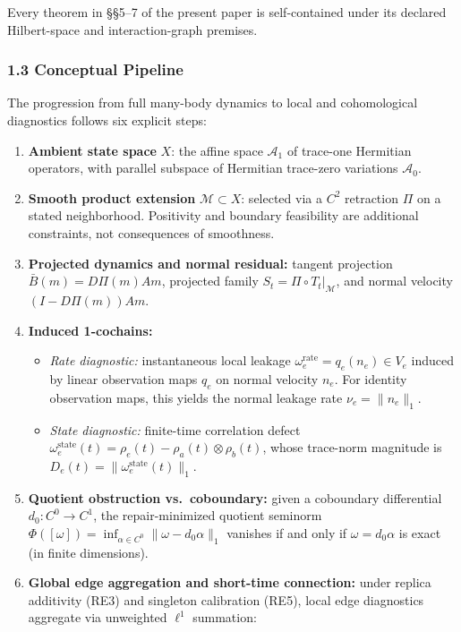 \documentclass[
  11pt,
]{article}
\providecommand{\tightlist}{%
  \setlength{\itemsep}{0pt}\setlength{\parskip}{0pt}}
\providecommand{\tightlist}{%
  \setlength{\itemsep}{0pt}\setlength{\parskip}{0pt}}
\begin{document}
Every theorem in §§5--7 of the present paper is self-contained under its declared Hilbert-space and interaction-graph premises.

\subsubsection{1.3 Conceptual Pipeline}\label{conceptual-pipeline}

The progression from full many-body dynamics to local and cohomological diagnostics follows six explicit steps:

\begin{enumerate}
\def\labelenumi{\arabic{enumi}.}
\tightlist
\item
  \textbf{Ambient state space} \(X\): the affine space \(\mathcal{A}_1\) of trace-one Hermitian operators, with parallel subspace of Hermitian trace-zero variations \(\mathcal{A}_0\).
\item
  \textbf{Smooth product extension} \(\mathcal{M}\subset X\): selected via a \(C^2\) retraction \(\Pi\) on a stated neighborhood. Positivity and boundary feasibility are additional constraints, not consequences of smoothness.
\item
  \textbf{Projected dynamics and normal residual:} tangent projection \(\bar B(m)=D\Pi(m)Am\), projected family \(S_t=\Pi\circ T_t|_{\mathcal{M}}\), and normal velocity \((I-D\Pi(m))Am\).
\item
  \textbf{Induced 1-cochains:}

  \begin{itemize}
  \tightlist
  \item
    \emph{Rate diagnostic:} instantaneous local leakage \(\omega_e^{\mathrm{rate}} = q_e(n_e) \in V_e\) induced by linear observation maps \(q_e\) on normal velocity \(n_e\). For identity observation maps, this yields the normal leakage rate \(\nu_e = \lVert n_e\rVert_1\).
  \item
    \emph{State diagnostic:} finite-time correlation defect \(\omega_e^{\mathrm{state}}(t) = \rho_e(t) - \rho_a(t)\otimes\rho_b(t)\), whose trace-norm magnitude is \(D_e(t) = \lVert\omega_e^{\mathrm{state}}(t)\rVert_1\).
  \end{itemize}
\item
  \textbf{Quotient obstruction vs.~coboundary:} given a coboundary differential \(d_0:C^0\to C^1\), the repair-minimized quotient seminorm \(\Phi([\omega])=\inf_{\alpha\in C^0}\lVert\omega-d_0\alpha\rVert_1\) vanishes if and only if \(\omega=d_0\alpha\) is exact (in finite dimensions).
\item
  \textbf{Global edge aggregation and short-time connection:} under replica additivity (RE3) and singleton calibration (RE5), local edge diagnostics aggregate via unweighted \(\ell^1\) summation:


\end{enumerate}
\end{document}
